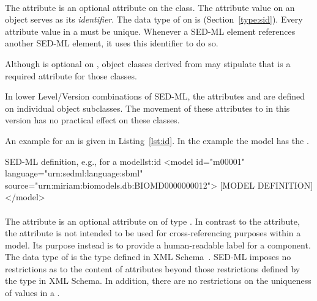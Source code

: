 \begin{blockChanged}

\paragraph*{}
\label{sec:id}
The  attribute is an optional attribute on the \SEDBase class.  The  attribute value on an object serves as its \emph{identifier}.  The data type of  on \SEDBase is  (Section~\ref{type:sid}).  Every  attribute value in a \SedDocument must be unique.  Whenever a SED-ML element references another SED-ML element, it uses this identifier to do so.

Although  is optional on \SEDBase, object classes derived from \SEDBase may stipulate that  is a required attribute for those classes.

In lower Level/Version combinations of SED-ML, the attributes  and  are defined on individual object subclasses.  The movement of these attributes to \SEDBase in this version has no practical effect on these classes.

An example for an  is given in Listing~\ref{lst:id}. In the example the model has the  .

\begin{myXmlLst}{SED-ML  definition, e.g., for a model}{lst:id}
<model id="m00001" language="urn:sedml:language:sbml" source="urn:miriam:biomodels.db:BIOMD0000000012">
	[MODEL DEFINITION]
</model>
\end{myXmlLst}


\paragraph*{}
\label{sec:name}
The attribute  is an optional attribute on \SEDBase of type .  
In contrast to the  attribute, the  attribute
is not intended to be used for cross-referencing
purposes within a model.  Its purpose instead is to provide a
human-readable label for a component.  The data type of 
 is the type  defined in XML
Schema~\citep{biron:2000,thompson:2000}.  SED-ML imposes no restrictions
as to the content of  attributes beyond those restrictions
defined by the  type in XML Schema.
In addition, there are no restrictions on the uniqueness
of  values in a \SedDocument.


\end{blockChanged}
